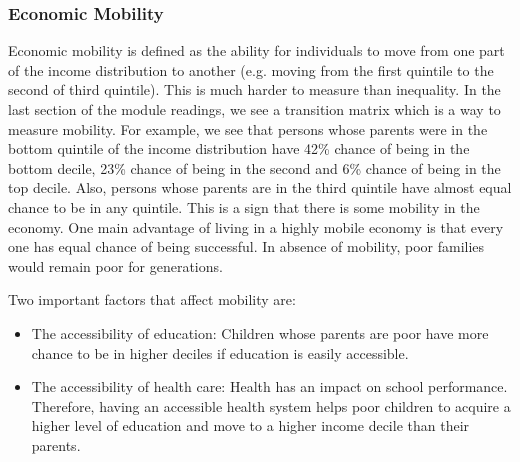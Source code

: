 \documentclass[letterpaper]{article}\usepackage[]{graphicx}\usepackage[]{color}
\numberwithin{exer}{section}
\theoremstyle{nonumberplain}
\begin{document}
\subsubsection*{Economic Mobility}

Economic mobility is defined as the ability for individuals to move
from one part of the income distribution to another (e.g. moving from
the first quintile to the second of third quintile). This is much
harder to measure than inequality. In the last section of the module
readings, we see a transition matrix which is a way to measure
mobility. For example, we see that persons whose parents were in the
bottom quintile of the income distribution have 42\% chance of being
in the bottom decile, 23\% chance of being in the second and 6\%
chance of being in the top decile.  Also, persons whose parents are in
the third quintile have almost equal chance to be in any
quintile. This is a sign that there is some mobility in the
economy. One main advantage of living in a highly mobile economy is
that every one has equal chance of being successful. In absence of
mobility, poor families would remain poor for generations.

Two important factors that affect mobility are:

\begin{itemize}
\item The accessibility of education: Children whose parents are poor have
  more chance to be in higher deciles if education is easily
  accessible.
\item The accessibility of health care: Health has an impact on school
  performance. Therefore, having an accessible health system helps
  poor children to acquire a higher level of education and move to a
  higher income decile than their parents.    
\end{itemize}

\newpage


\end{document}
